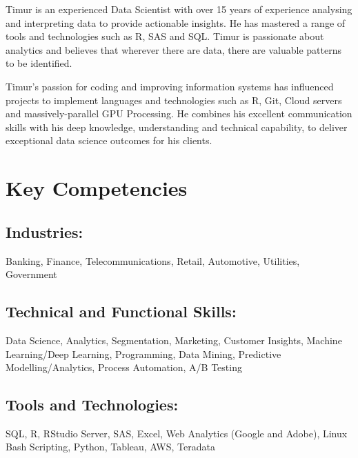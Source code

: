 \documentclass{article}
\begin{document}

\pagestyle{fancy}
\fancyhf{} %


Timur is an experienced Data Scientist with over 15 years of experience analysing and interpreting data to provide actionable insights. He has mastered a range of tools and technologies such as R, SAS and SQL. Timur is passionate about analytics and believes that wherever there are data, there are valuable patterns to be identified.

Timur's passion for coding and improving information systems has influenced projects to implement languages and technologies such as R, Git, Cloud servers and massively-parallel GPU
Processing. He combines his excellent communication skills with his deep knowledge, understanding and technical capability, to deliver exceptional data science outcomes for his clients.

\section{Key Competencies}
\subsection{Industries:}
Banking, Finance, Telecommunications, Retail, Automotive, Utilities, Government

\subsection{Technical and Functional Skills:}
Data Science, Analytics, Segmentation, Marketing, Customer Insights, Machine Learning/Deep Learning, Programming, Data Mining, Predictive Modelling/Analytics, Process Automation, A/B Testing

\subsection{Tools and Technologies:}
SQL, R, RStudio Server, SAS, Excel, Web Analytics (Google and Adobe), Linux Bash Scripting, Python, Tableau, AWS, Teradata
\end{document}

